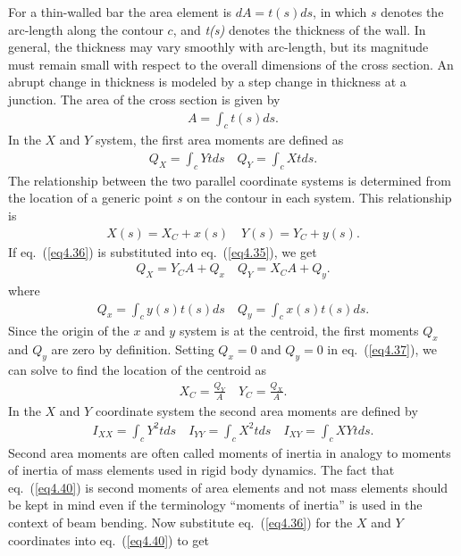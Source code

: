 \documentclass{AeroStructure-ERJohnson}
\begin{document}
For a thin-walled bar the area element is $d A=t(s) d s$, in which $s$ denotes the arc-length along the contour $c$, and \textit{t(s)} denotes the thickness of the wall. In general, the thickness may vary smoothly with arc-length, but its magnitude must remain small with respect to the overall dimensions of the cross section. An abrupt change in thickness is modeled by a step change in thickness at a junction. The area of the cross section is given by
\begin{align}\label{eq4.34}
A=\int_{c} t(s) d s.
\end{align}
In the $X$ and $Y$ system, the first area moments are defined as
\begin{align}\label{eq4.35}
Q_{X}=\int_{c} Y t d s \quad Q_{Y}=\int_{c} X t d s.
\end{align}
The relationship between the two parallel coordinate systems is determined from the location of a generic point $s$ on the contour in each system. This relationship is
\begin{align}\label{eq4.36}
X(s)=X_{C}+x(s) \quad Y(s)=Y_{C}+y(s).
\end{align}
If eq.~(\ref{eq4.36}) is substituted into eq.~(\ref{eq4.35}), we get
\begin{align}\label{eq4.37}
Q_{X}=Y_{C} A+Q_{x} \quad Q_{Y}=X_{C} A+Q_{y}.
\end{align}
where
\begin{align}\label{eq4.38}
Q_{x}=\int_{c} y(s) t(s) d s \quad Q_{y}=\int_{c} x(s) t(s) d s.
\end{align}
Since the origin of the $x$ and $y$ system is at the centroid, the first moments $Q_{x}$ and $Q_{y}$ are zero by definition. Setting $Q_{x}=0$ and $Q_{y}=0$ in eq.~(\ref{eq4.37}), we can solve to find the location of the centroid as
\begin{align}\label{eq4.39}
X_{C}=\frac{Q_{Y}}{A} \quad Y_{C}=\frac{Q_{X}}{A}.
\end{align}
In the $X$ and $Y$ coordinate system the second area moments are defined by
\begin{align}\label{eq4.40}
I_{X X}=\int_{c} Y^{2} t d s \quad I_{Y Y}=\int_{c} X^{2} t d s \quad I_{X Y}=\int_{c} X Y t d s.
\end{align}
Second area moments are often called moments of inertia in analogy to moments of inertia of mass elements used in rigid body dynamics. The fact that eq.~(\ref{eq4.40}) is second moments of area elements and not mass elements should be kept in mind even if the terminology ``moments of inertia'' is used in the context of beam bending. Now substitute eq.~(\ref{eq4.36}) for the $X$ and $Y$ coordinates into eq.~(\ref{eq4.40}) to get
\end{document}

